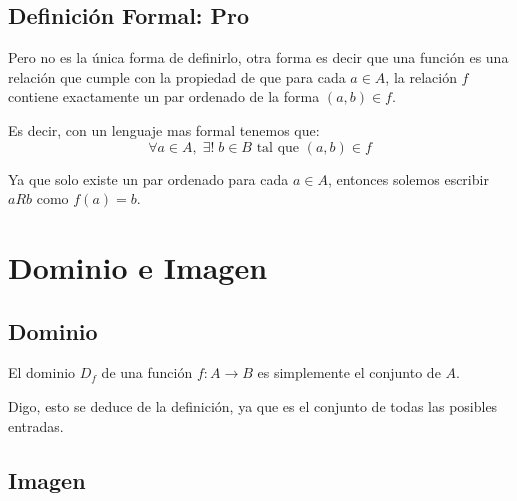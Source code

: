 \documentclass[12pt, fleqn]{report}                             %
\theoremstyle{break}                                            %
\begin{document}
            \subsection*{Definición Formal: Pro}

                Pero no es la única forma de definirlo, otra forma es decir que una función es
                una relación que cumple con la propiedad de que para cada $a \in A$, la relación
                $f$ contiene exactamente un par ordenado de la forma $(a,b) \in f$.

                Es decir, con un lenguaje mas formal tenemos que:
                \begin{equation*}
                    \forall a \in A, \; \exists ! \; b \in B \text{ tal que } (a,b) \in f
                \end{equation*}

                Ya que solo existe un par ordenado para cada $a \in A$, entonces solemos escribir 
                $aRb$ como $f(a) = b$.








        \clearpage
        \section{Dominio e Imagen}
            
            \subsection*{Dominio}

                El dominio $D_f$ de una función $f : A \to B$ es simplemente el conjunto de $A$.

                Digo, esto se deduce de la definición, ya que es el conjunto de todas las posibles
                entradas.

            \subsection*{Imagen}
\end{document}
